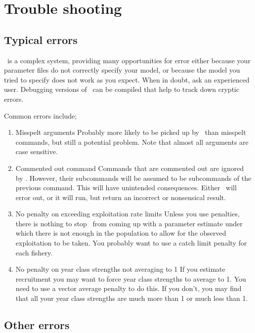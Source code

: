 \section{Trouble shooting\label{sec:trouble-shooting}}

\subsection{Typical errors\label{sec:typical-errors}}

\SPM\ is a complex system, providing many opportunities for error \textemdash either because your parameter files do not correctly specify your model, or because the model you tried to specify does not work as you expect. When in doubt, ask an experienced user. Debugging versions of \SPM\ can be compiled that help to track down cryptic errors.

Common errors include;
\begin{enumerate}
\item Misspelt arguments
Probably more likely to be picked up by \SPM\ than misspelt commands, but still a potential problem. Note that almost all arguments are case sensitive.

\item Commented out command
Commands that are commented out are ignored by \SPM. However, their subcommands will be assumed to be subcommands of the previous command. This will have unintended consequences. Either \SPM\ will error out, or it will run, but return an incorrect or nonsensical result. 

\item No penalty on exceeding exploitation rate limits
Unless you use penalties, there is nothing to stop \SPM\ from coming up with a parameter estimate under which there is not enough in the population to allow for the observed exploitation to be taken. You probably want to use a catch limit penalty for each fishery. 

\item No penalty on year class strengths not averaging to 1
If you estimate recruitment you may want to force year class strengths to average to 1. You need to use a vector average penalty to do this. If you don't, you may find that all your year class strengths are much more than 1 or much less than 1. 
\end{enumerate}

\subsection{Other errors}

